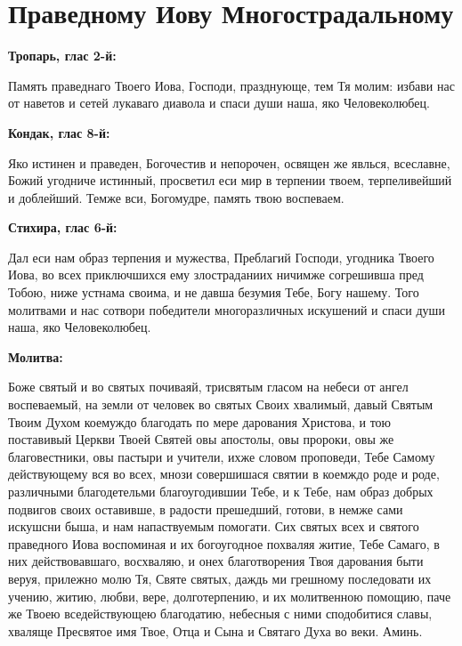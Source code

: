 

\label{_content_obiscelenii}

 


 
\vspace{-\baselineskip}
\section{Праведному Иову Многострадальному}
 


\bfseries Тропарь, глас 2-й:\normalfont{}\nopagebreak


Память праведнаго Твоего Иова, Господи, празднующе, тем Тя молим: избави нас от наветов и сетей лукаваго диавола и спаси души наша, яко Человеколюбец.


\medskip


\bfseries Кондак, глас 8-й:\normalfont{}\nopagebreak


Яко истинен и праведен, Богочестив и непорочен, освящен же явлься, всеславне, Божий угодниче истинный, просветил еси мир в терпении твоем, терпеливейший и доблейший. Темже вси, Богомудре, память твою воспеваем.


\medskip


\bfseries Стихира, глас 6-й:\normalfont{}\nopagebreak


Дал еси нам образ терпения и мужества, Преблагий Господи, угодника Твоего Иова, во всех приключшихся ему злостраданиих ничимже согрешивша пред Тобою, ниже устнама своима, и не давша безумия Тебе, Богу нашему. Того молитвами и нас сотвори победители многоразличных искушений и спаси души наша, яко Человеколюбец.


\medskip


\bfseries Молитва:\normalfont{}\nopagebreak


Боже святый и во святых почиваяй, трисвятым гласом на небеси от ангел воспеваемый, на земли от человек во святых Своих хвалимый, давый Святым Твоим Духом коемуждо благодать по мере дарования Христова, и тою поставивый Церкви Твоей Святей овы апостолы, овы пророки, овы же благовестники, овы пастыри и учители, ихже словом проповеди, Тебе Самому действующему вся во всех, мнози совершишася святии в коемждо роде и роде, различными благодетельми благоугодившии Тебе, и к Тебе, нам образ добрых подвигов своих оставивше, в радости прешедший, готови, в немже сами искушсни быша, и нам напаствуемым помогати. Сих святых всех и святого праведного Иова  воспоминая и их богоугодное похваляя житие, Тебе Самаго, в них действовавшаго, восхваляю, и онех благотворения Твоя дарования быти веруя, прилежно молю Тя, Святе святых, даждь ми грешному последовати их учению, житию, любви, вере, долготерпению, и их молитвенною помощию, паче же Твоею вседействующею благодатию, небесныя с ними сподобитися славы, хваляще Пресвятое имя Твое, Отца и Сына и Святаго Духа во веки. Аминь.
\mychapterending

